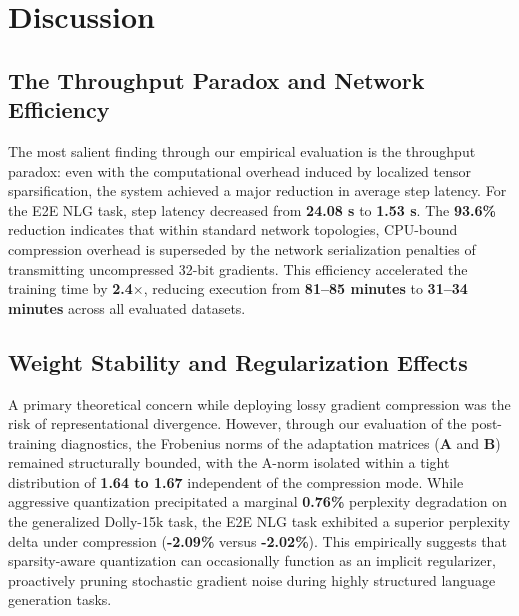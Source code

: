 \documentclass{ieeeaccess}
\begin{document}
\section{Discussion}
\label{sec:discussion}

\subsection{The Throughput Paradox and Network Efficiency}
The most salient finding through our empirical evaluation is the throughput paradox: even with the computational overhead induced by localized tensor sparsification, the system achieved a major reduction in average step latency. For the E2E NLG task, step latency decreased from \textbf{24.08 s} to \textbf{1.53 s}. The \textbf{93.6\%} reduction indicates that within standard network topologies, CPU-bound compression overhead is superseded by the network serialization penalties of transmitting uncompressed 32-bit gradients. This efficiency accelerated the training time by \textbf{2.4$\times$}, reducing execution from \textbf{81--85 minutes} to \textbf{31--34 minutes} across all evaluated datasets.

\subsection{Weight Stability and Regularization Effects}
A primary theoretical concern while deploying lossy gradient compression was the risk of representational divergence. However, through our evaluation of the post-training diagnostics, the Frobenius norms of the adaptation matrices (\textbf{A} and \textbf{B}) remained structurally bounded, with the A-norm isolated within a tight distribution of \textbf{1.64 to 1.67} independent of the compression mode. While aggressive quantization precipitated a marginal \textbf{0.76\%} perplexity degradation on the generalized Dolly-15k task, the E2E NLG task exhibited a superior perplexity delta under compression (\textbf{-2.09\%} versus \textbf{-2.02\%}). This empirically suggests that sparsity-aware quantization can occasionally function as an implicit regularizer, proactively pruning stochastic gradient noise during highly structured language generation tasks.
\end{document}
